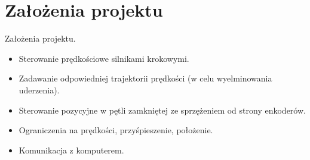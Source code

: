 \documentclass{beamer}
\begin{document}
\section{Założenia projektu}
\begin{frame}{Założenia projektu.}

	\begin{itemize}
		\item {
			Sterowanie prędkościowe silnikami krokowymi.
		}
		\item {
			Zadawanie odpowiedniej trajektorii prędkości (w celu wyelminowania uderzenia).
		}
		\item {
			Sterowanie pozycyjne w pętli zamkniętej ze sprzężeniem od strony enkoderów.
		}
		\item{
			Ograniczenia na prędkości, przyśpieszenie, położenie.
		}
		\item{
			Komunikacja z komputerem.
		}
	\end{itemize}
	
		\begin{figure}%
			\centering
			\qquad
			\qquad
			\label{fig:example2}%
		\end{figure}
\end{frame}
\end{document}
